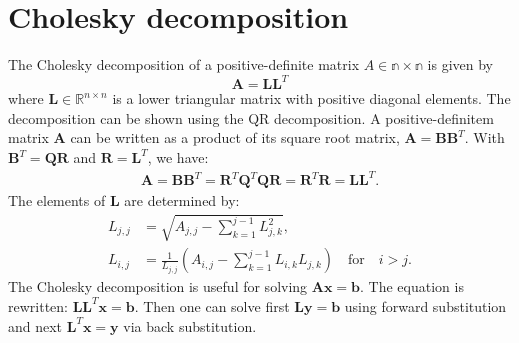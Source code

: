 \documentclass[11pt, a4paper, parskip=half*, bibliography=totoc, cleardoublepage=empty, final,
numbers=noenddot]{scrbook}
\begin{document}
\section{Cholesky decomposition} \label{sec:cholesky}
The Cholesky decomposition of a positive-definite matrix $A \in \mathbb{n \times n}$ is given by
\begin{equation}
\bm{A} = \bm{L} \bm{L}^T
\end{equation}
where $\bm{L} \in \mathbb{R}^{n \times n}$ is a lower triangular matrix with positive diagonal elements. The decomposition can be shown using the QR decomposition.
A positive-definitem matrix $\bm{A}$ can be written as a product of its square root matrix, $\bm{A} = \bm{B} \bm{B}^T$. With $\bm{B}^T = \bm{Q} \bm{R}$ and $\bm{R} = \bm{L}^T$, we have:
\begin{align}
\bm{A} = \bm{B} \bm{B}^T = \bm{R}^T \bm{Q}^T \bm{Q} \bm{R} = \bm{R}^T \bm{R} = \bm{L} \bm{L}^T. 
\end{align}
The elements of $\bm{L}$ are determined by:
\begin{align}
L_{j,j} &= \sqrt{A_{j, j} - \sum_{k=1}^{j-1} L_{j,k}^2},\\
L_{i,j} &= \frac{1}{L_{j,j}} \left( A_{i, j} - \sum_{k=1}^{j-1} L_{i,k} L_{j,k}\right) \quad \text{for} \quad i>j.
\end{align}
The Cholesky decomposition is useful for solving $\bm{A} \bm{x} = \bm{b}$. The equation is rewritten: $\bm{L} \bm{L}^T \bm{x} = \bm{b}$. Then one can solve first $\bm{L}  \bm{y} = \bm{b}$ using forward substitution and next $ \bm{L}^T \bm{x} = \bm{y}$ via back substitution.
\end{document}
